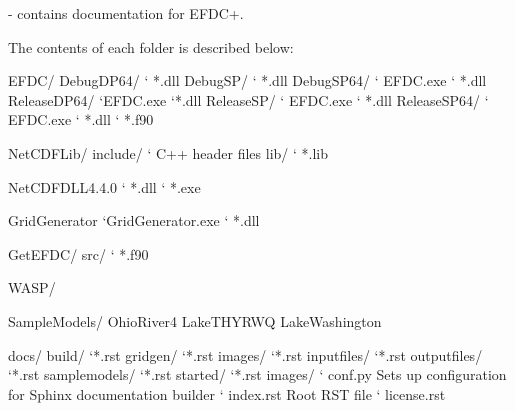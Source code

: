 \documentclass[letterpaper,10pt,english]{sphinxmanual}
\begin{document}
 - contains documentation for EFDC+.

The contents of each folder is described below:

\begin{sphinxVerbatim}[commandchars=\\\{\}]
EFDC/ \PYGZhy{}
        \textbar{}\PYGZhy{}\PYGZhy{} DebugDP64/
                {}`\PYGZhy{}\PYGZhy{} *.dll
        \textbar{}\PYGZhy{}\PYGZhy{} DebugSP/
                {}`\PYGZhy{}\PYGZhy{} *.dll
        \textbar{}\PYGZhy{}\PYGZhy{} DebugSP64/
                {}`\PYGZhy{}\PYGZhy{} EFDC.exe
                {}`\PYGZhy{}\PYGZhy{} *.dll
        \textbar{}\PYGZhy{}\PYGZhy{} ReleaseDP64/
                {}`\PYGZhy{}\PYGZhy{}EFDC.exe
                {}`\PYGZhy{}\PYGZhy{}*.dll
        \textbar{}\PYGZhy{}\PYGZhy{} ReleaseSP/
                {}`\PYGZhy{}\PYGZhy{} EFDC.exe
                {}`\PYGZhy{}\PYGZhy{} *.dll
        \textbar{}\PYGZhy{}\PYGZhy{} ReleaseSP64/
                {}`\PYGZhy{}\PYGZhy{} EFDC.exe
                {}`\PYGZhy{}\PYGZhy{} *.dll
        {}`\PYGZhy{}\PYGZhy{} *.f90

NetCDFLib/
        \textbar{}\PYGZhy{}\PYGZhy{}     include/
                {}`\PYGZhy{}\PYGZhy{} C++ header files
        \textbar{}\PYGZhy{}\PYGZhy{}     lib/
                {}`\PYGZhy{}\PYGZhy{} *.lib

NetCDFDLL4.4.0
        {}`\PYGZhy{}\PYGZhy{}     *.dll
        {}`\PYGZhy{}\PYGZhy{}     *.exe

GridGenerator
        {}`\PYGZhy{}\PYGZhy{}GridGenerator.exe
        {}`\PYGZhy{}\PYGZhy{}     *.dll

GetEFDC/
        \textbar{}\PYGZhy{}\PYGZhy{} src/
                {}`\PYGZhy{}\PYGZhy{} *.f90

WASP/

SampleModels/
        \textbar{}\PYGZhy{}\PYGZhy{} Ohio\PYGZus{}River\PYGZus{}4
        \textbar{}\PYGZhy{}\PYGZhy{} Lake\PYGZus{}T\PYGZus{}HYR\PYGZus{}WQ
        \textbar{}\PYGZhy{}\PYGZhy{} Lake\PYGZus{}Washington

docs/
        \textbar{}\PYGZhy{}\PYGZhy{} build/
                {}`\PYGZhy{}\PYGZhy{}*.rst
        \textbar{}\PYGZhy{}\PYGZhy{} gridgen/
                {}`\PYGZhy{}\PYGZhy{}*.rst
        \textbar{}\PYGZhy{}\PYGZhy{} images/
                {}`\PYGZhy{}\PYGZhy{}*.rst
        \textbar{}\PYGZhy{}\PYGZhy{} inputfiles/
                {}`\PYGZhy{}\PYGZhy{}*.rst
        \textbar{}\PYGZhy{}\PYGZhy{} outputfiles/
                {}`\PYGZhy{}\PYGZhy{}*.rst
        \textbar{}\PYGZhy{}\PYGZhy{} samplemodels/
                {}`\PYGZhy{}\PYGZhy{}*.rst
        \textbar{}\PYGZhy{}\PYGZhy{} started/
                {}`\PYGZhy{}\PYGZhy{}*.rst
        \textbar{}\PYGZhy{}\PYGZhy{} \PYGZus{}images/
        {}`\PYGZhy{}\PYGZhy{} conf.py \PYGZhy{} Sets up configuration for Sphinx documentation builder
        {}`\PYGZhy{}\PYGZhy{} index.rst \PYGZhy{} Root RST file
        {}`\PYGZhy{}\PYGZhy{} license.rst
\end{sphinxVerbatim}
\end{document}
